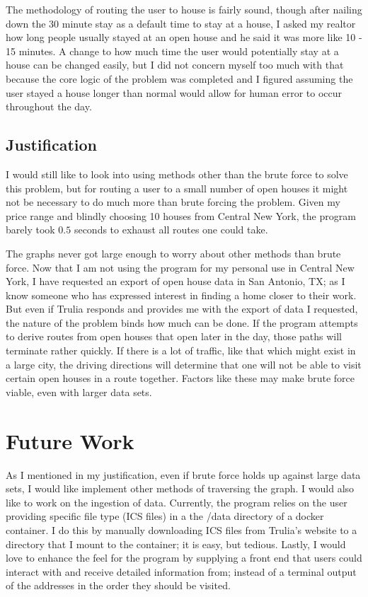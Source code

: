 \documentclass[letterpaper,11pt]{report}
\theoremstyle{definition}
\theoremstyle{definition}
\begin{document}
The methodology of routing the user to house is fairly sound, though after nailing down the 30 minute stay as a default time to stay at a house, I asked my realtor how long people usually stayed at an open house and he said it was more like 10 - 15 minutes. A change to how much time the user would potentially stay at a house can be changed easily, but I did not concern myself too much with that because the core logic of the problem was completed and I figured assuming the user stayed a house longer than normal would allow for human error to occur throughout the day.

\subsection{Justification}
I would still like to look into using methods other than the brute force to solve this problem, but for routing a user to a small number of open houses it might not be necessary to do much more than brute forcing the problem. Given my price range and blindly choosing 10 houses from Central New York, the program barely took $0.5$ seconds to exhaust all routes one could take. 

The graphs never got large enough to worry about other methods than brute force. Now that I am not using the program for my personal use in Central New York, I have requested an export of open house data in San Antonio, TX; as I know someone who has expressed interest in finding a home closer to their work. But even if Trulia responds and provides me with the export of data I requested, the nature of the problem binds how much can be done. If the program attempts to derive routes from open houses that open later in the day, those paths will terminate rather quickly. If there is a lot of traffic, like that which might exist in a large city, the driving directions will determine that one will not be able to visit certain open houses in a route together. Factors like these may make brute force viable, even with larger data sets.

\section{Future Work}
As I mentioned in my justification, even if brute force holds up against large data sets, I would like implement other methods of traversing the graph. I would also like to work on the ingestion of data. Currently, the program relies on the user providing specific file type (ICS files) in a the \textsf{/data} directory of a docker container. I do this by manually downloading ICS files from Trulia's website to a directory that I mount to the container; it is easy, but tedious. Lastly, I would love to enhance the feel for the program by supplying a front end that users could interact with and receive detailed information from; instead of a terminal output of the addresses in the order they should be visited.
\end{document}
